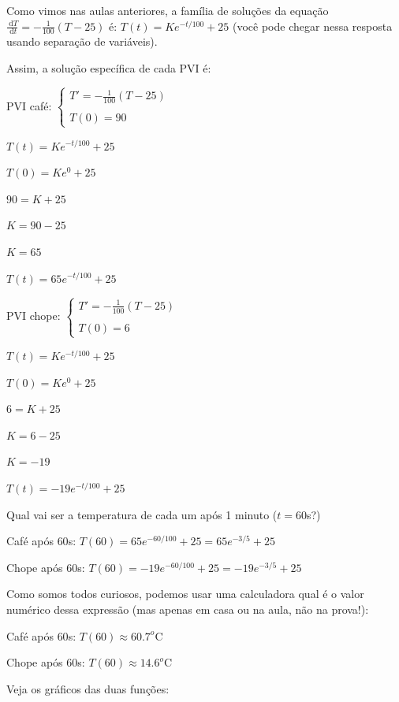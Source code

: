 \documentclass[a4paper]{article}
\newcommand{\ud}{\mathrm{\ d}}
\begin{document}
Como vimos nas aulas anteriores, a família de soluções da equação
$\frac{\ud T}{\ud t}=-\frac{1}{100}(T-25)$ é: $T(t)=Ke^{-t/100}+25$
(você pode chegar nessa resposta usando separação de variáveis).

Assim, a solução específica de cada PVI é:

\begin{multicols}{2}
PVI café:  $\left\{
    \begin{array}{l}
      T'=-\frac{1}{100}(T-25)\\
      \\
      T(0)=90
    \end{array}
  \right.$

$T(t)=Ke^{-t/100}+25$

$T(0)=Ke^{0}+25$

$90=K+25$

$K= 90 - 25$

$K=65$

$T(t)=65e^{-t/100}+25$

\columnbreak

PVI chope:  $\left\{
    \begin{array}{l}
      T'=-\frac{1}{100}(T-25)\\
      \\
      T(0)=6
    \end{array}
  \right.$

$T(t)=Ke^{-t/100}+25$

$T(0)=Ke^{0}+25$

$6=K+25$

$K= 6 - 25$

$K=-19$

$T(t)=-19e^{-t/100}+25$

\end{multicols}

Qual vai ser a temperatura de cada um após 1 minuto ($t=60$s?)

Café após $60$s: $T(60)=65e^{-60/100}+25 = 65e^{-3/5}+25$

Chope após $60$s: $T(60)=-19e^{-60/100}+25 = -19e^{-3/5}+25$

Como somos todos curiosos, podemos usar uma calculadora qual é o valor numérico dessa
expressão (mas apenas em casa ou na aula, não na prova!):

Café após $60$s: $T(60)\approx 60.7^o$C

Chope após $60$s: $T(60)\approx 14.6^o$C

Veja os gráficos das duas funções:
\end{document}

